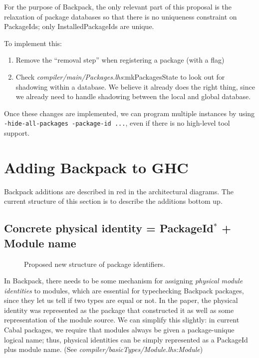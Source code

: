 \documentclass{article}
\newcommand{\ghcfile}[1]{\textsl{#1}}
\begin{document}
For the purpose of Backpack, the only relevant part of this proposal
is the relaxation of package databases so that there is no uniqueness
constraint on PackageIds; only InstalledPackageIds are unique.

To implement this:

\begin{enumerate}

    \item Remove the ``removal step'' when registering a package (with a flag)

    \item Check \ghcfile{compiler/main/Packages.lhs}:mkPackagesState to look out for shadowing
      within a database. We believe it already does the right thing, since
      we already need to handle shadowing between the local and global database.

\end{enumerate}

Once these changes are implemented, we can program multiple instances by
using \verb|-hide-all-packages -package-id ...|, even if there is no
high-level tool support.

\section{Adding Backpack to GHC}

Backpack additions are described in red in the architectural diagrams.
The current structure of this section is to describe the additions bottom up.

\subsection{Concrete physical identity = PackageId$^*$ + Module name}\label{sec:ipi}

\begin{figure}
\label{fig:proposed-pkgid}\caption{Proposed new structure of package identifiers.}
\end{figure}

In Backpack, there needs to be some mechanism for assigning
\emph{physical module identities} to modules, which are essential for
typechecking Backpack packages, since they let us tell if two types are
equal or not. In the paper, the physical identity was represented as the
package that constructed it as well as some representation of the module
source.  We can simplify this slightly: in current Cabal packages, we
require that modules always be given a package-unique logical name;
thus, physical identities can be simply represented as a PackageId plus
module name. (See \ghcfile{compiler/basicTypes/Module.lhs:Module})
\end{document}
